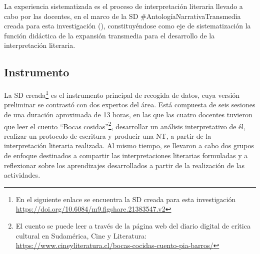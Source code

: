 \documentclass[spanish]{textolivre}
\begin{document}
La experiencia sistematizada es el proceso de interpretación literaria llevado a cabo por las docentes, en el marco de la SD \#AntologíaNarrativaTransmedia creada para esta investigación (), constituyéndose como eje de sistematización la función didáctica de la expansión transmedia para el desarrollo de la interpretación literaria.

\subsection{Instrumento}\label{sec-organizacao}
La SD creada\footnote{En el siguiente enlace se encuentra la SD creada para esta investigación \url{https://doi.org/10.6084/m9.figshare.21383547.v2}} es el instrumento principal de recogida de datos, cuya versión preliminar se contrastó con dos expertos del área. Está compuesta de seis sesiones de una duración aproximada de 13 horas, en las que las cuatro docentes tuvieron que leer el cuento “Bocas cosidas”\footnote{El cuento se puede leer a través de la página web del diario digital de crítica cultural en Sudamérica, Cine y Literatura: \url{https://www.cineyliteratura.cl/bocas-cocidas-cuento-pia-barros/}}, desarrollar un análisis interpretativo de él, realizar un protocolo de escritura y producir una NT, a partir de la interpretación literaria realizada. Al mismo tiempo, se llevaron a cabo dos grupos de enfoque destinados a compartir las interpretaciones literarias formuladas y a reflexionar sobre los aprendizajes desarrollados a partir de la realización de las actividades.
\end{document}
